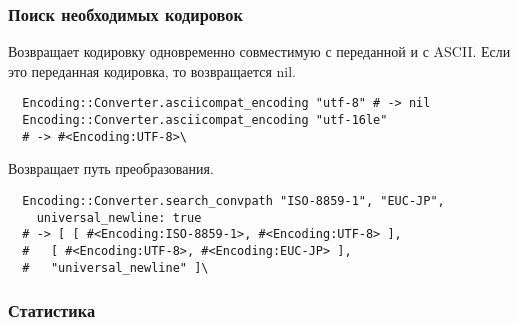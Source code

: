 \subsubsection*{Поиск необходимых кодировок}

\begin{methodlist}
  Возвращает кодировку одновременно совместимую с переданной и с ASCII. Если это переданная кодировка, то возвращается nil.
  \begin{verbatim}
  Encoding::Converter.asciicompat_encoding "utf-8" # -> nil 
  Encoding::Converter.asciicompat_encoding "utf-16le" 
  # -> #<Encoding:UTF-8>\
  \end{verbatim}

  Возвращает путь преобразования.
  \begin{verbatim}
  Encoding::Converter.search_convpath "ISO-8859-1", "EUC-JP",
    universal_newline: true 
  # -> [ [ #<Encoding:ISO-8859-1>, #<Encoding:UTF-8> ],
  #   [ #<Encoding:UTF-8>, #<Encoding:EUC-JP> ],
  #   "universal_newline" ]\
  \end{verbatim}
\end{methodlist}

\subsubsection*{Статистика}

